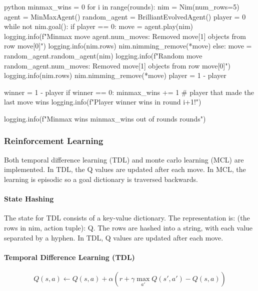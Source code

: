 \begin{mintedbox}{python}
    minmax_wins = 0
    for i in range(rounds):
        nim = Nim(num_rows=5)
        agent = MinMaxAgent()
        random_agent = BrilliantEvolvedAgent()
        player = 0
        while not nim.goal():
            if player == 0:
                move = agent.play(nim)
                logging.info(f"Minmax move {agent.num_moves}: Removed {move[1]} objects from row {move[0]}")
                logging.info(nim.rows)
                nim.nimming_remove(*move)
            else:
                move = random_agent.random_agent(nim)
                logging.info(f"Random move {random_agent.num_moves}: Removed {move[1]} objects from row {move[0]}")
                logging.info(nim.rows)
                nim.nimming_remove(*move)
            player = 1 - player

        winner = 1 - player
        if winner == 0:
            minmax_wins += 1
        # player that made the last move wins
        logging.info(f"Player {winner} wins in round {i+1}!")

    logging.info(f"Minmax wins {minmax_wins} out of {rounds} rounds")
\end{mintedbox}

\subsubsection{Reinforcement Learning}

Both temporal difference learning (TDL) and monte carlo learning (MCL) are implemented. In TDL, the Q values are updated after each move. In MCL, the learning is episodic so a goal dictionary is traversed backwards. \\

\paragraph{State Hashing} The state for TDL consists of a key-value dictionary. The representation is: (the rows in nim, action tuple): Q. The rows are hashed into a string, with each value separated by a hyphen. In TDL, Q values are updated after each move.

\paragraph{Temporal Difference Learning (TDL)}

\begin{equation*}
    Q(s, a) \leftarrow Q(s, a) + \alpha \left( r + \gamma \max_{a'} Q(s', a') - Q(s, a) \right)
\end{equation*}

